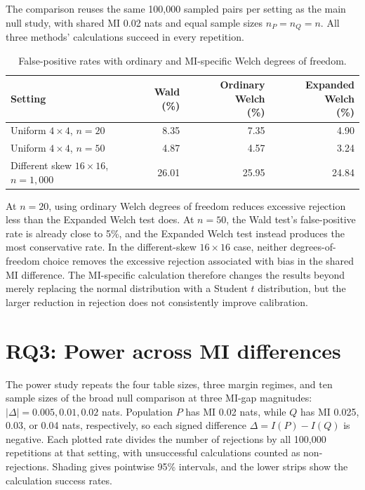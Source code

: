 The comparison reuses the same 100,000 sampled pairs per setting as the
main null study, with shared MI 0.02 nats and equal sample sizes
\(n_P=n_Q=n\). All three methods' calculations succeed in every repetition.

\begin{table}[H]
\centering
\caption{False-positive rates with ordinary and MI-specific Welch degrees of freedom.}
\label{tab:ordinary-welch-comparison}
\thesistableformat
\begin{tabularx}{\textwidth}{@{}>{\raggedright\arraybackslash}Xrrr@{}}
\toprule
Setting & \shortstack{Wald\\(\%)} & \shortstack{Ordinary Welch\\(\%)} & \shortstack{Expanded Welch\\(\%)}\\
\midrule
Uniform \(4\times4\), \(n=20\) & 8.35 & 7.35 & 4.90\\
Uniform \(4\times4\), \(n=50\) & 4.87 & 4.57 & 3.24\\
Different skew \(16\times16\), \(n=1{,}000\) & 26.01 & 25.95 & 24.84\\
\bottomrule
\end{tabularx}
\end{table}

At \(n=20\), using ordinary Welch degrees of freedom reduces excessive
rejection less than the Expanded Welch test does. At \(n=50\), the Wald
test's false-positive rate is already close to 5\%, and the Expanded Welch
test instead produces the most conservative rate. In the different-skew
\(16\times16\) case, neither degrees-of-freedom choice removes the excessive rejection
associated with bias in the shared MI difference. The MI-specific
calculation therefore changes the results beyond merely replacing the
normal distribution with a Student \(t\) distribution, but the larger
reduction in rejection does not consistently improve calibration.

\section{RQ3: Power across MI differences}
\label{sec:mi-gap-power-results}

The power study repeats the four table sizes, three margin regimes, and
ten sample sizes of the broad null comparison at three MI-gap magnitudes:
\(|\Delta|=0.005,0.01,0.02\) nats. Population \(P\) has MI 0.02 nats,
while \(Q\) has MI 0.025, 0.03, or 0.04 nats, respectively, so each
signed difference \(\Delta=I(P)-I(Q)\) is negative. Each plotted rate
divides the number of rejections by all 100,000 repetitions at that setting,
with unsuccessful calculations counted as non-rejections. Shading gives
pointwise 95\% intervals, and the lower strips show the calculation success rates.

